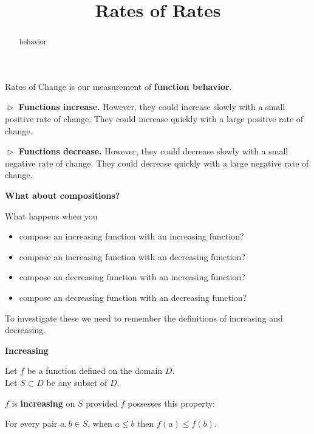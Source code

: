 \documentclass{ximera}
\title{Rates of Rates}
\begin{document}
\begin{abstract}
behavior
\end{abstract}
\maketitle




Rates of Change is our measurement of \textbf{function behavior}.




$\vartriangleright$  \textbf{\textcolor{blue!55!black}{Functions increase.}}  However, they could increase slowly with a small positive rate of change.  They could increase quickly with a large positive rate of change. 



$\vartriangleright$  \textbf{\textcolor{blue!55!black}{Functions decrease.}}  However, they could decrease slowly with a small negative rate of change.  They could decrease quickly with a large negative rate of change. 





\textbf{\textcolor{purple!85!blue}{What about compositions?}}





What happens when you


\begin{itemize}
\item compose an increasing function with an increasing function?
\item compose an increasing function with an decreasing function?
\item compose an decreasing function with an increasing function?
\item compose an decreasing function with an decreasing function?
\end{itemize}



To investigate these we need to remember the definitions of increasing and decreasing.






\begin{summary} \textbf{\textcolor{green!50!black}{Increasing}} 


Let $f$ be a function defined on the domain $D$. \\
Let $S \subset D$ be any subset of $D$.

$f$ is \textbf{increasing} on $S$ provided $f$ possesses this property:  


\begin{center}
For every pair $a, b \in S$, when $a \leq b$ then $f(a) \leq f(b)$.
\end{center}

\end{summary}
\end{document}
